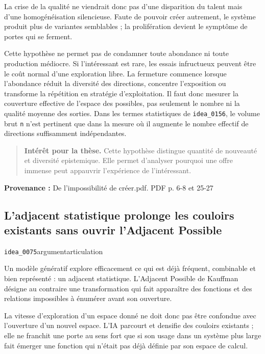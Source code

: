 \documentclass[10pt,a4paper]{article}
\begin{document}
La crise de la qualité ne viendrait donc pas d'une disparition du talent mais d'une homogénéisation silencieuse. Faute de pouvoir créer autrement, le système produit plus de variantes semblables ; la prolifération devient le symptôme de portes qui se ferment.

Cette hypothèse ne permet pas de condamner toute abondance ni toute production médiocre. Si l'intéressant est rare, les essais infructueux peuvent être le coût normal d'une exploration libre. La fermeture commence lorsque l'abondance réduit la diversité des directions, concentre l'exposition ou transforme la répétition en stratégie d'exploitation. Il faut donc mesurer la couverture effective de l'espace des possibles, pas seulement le nombre ni la qualité moyenne des sorties. Dans les termes statistiques de \texttt{idea\_0156}, le volume brut \texttt{n} n'est pertinent que dans la mesure où il augmente le nombre effectif de directions suffisamment indépendantes.

\begin{quote}
\textbf{Intérêt pour la thèse.} Cette hypothèse distingue quantité de nouveauté et diversité epistemique. Elle permet d'analyser pourquoi une offre immense peut appauvrir l'expérience de l'intéressant.
\end{quote}
{\footnotesize\color{metadata}\textbf{Provenance :} De l'impossibilité de créer.pdf. PDF p. 6-8 et 25-27\par}

\subsection{L'adjacent statistique prolonge les couloirs existants sans ouvrir l'Adjacent Possible}
{\small\color{metadata} \texttt{idea\_0075}\quad\textbullet\quad argument\quad\textbullet\quad articulation\par}

Un modèle génératif explore efficacement ce qui est déjà fréquent, combinable et bien représenté : un adjacent statistique. L'Adjacent Possible de Kauffman désigne au contraire une transformation qui fait apparaître des fonctions et des relations impossibles à énumérer avant son ouverture.

La vitesse d'exploration d'un espace donné ne doit donc pas être confondue avec l'ouverture d'un nouvel espace. L'IA parcourt et densifie des couloirs existants ; elle ne franchit une porte au sens fort que si son usage dans un système plus large fait émerger une fonction qui n'était pas déjà définie par son espace de calcul.
\end{document}
